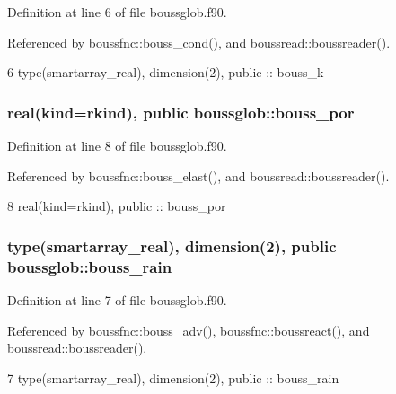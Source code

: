 Definition at line 6 of file boussglob.\+f90.



Referenced by boussfnc\+::bouss\+\_\+cond(), and boussread\+::boussreader().


\begin{DoxyCode}
6   \textcolor{keywordtype}{type}(smartarray_real), \textcolor{keywordtype}{dimension(2)}, \textcolor{keywordtype}{public} :: bouss_k
\end{DoxyCode}
\subsubsection[{bouss\+\_\+por}]{\setlength{\rightskip}{0pt plus 5cm}real(kind=rkind), public boussglob\+::bouss\+\_\+por}\label{namespaceboussglob_a22f276259c3f43d3bfde4ee94bb0046a}


Definition at line 8 of file boussglob.\+f90.



Referenced by boussfnc\+::bouss\+\_\+elast(), and boussread\+::boussreader().


\begin{DoxyCode}
8   \textcolor{keywordtype}{real(kind=rkind)}, \textcolor{keywordtype}{public} :: bouss_por
\end{DoxyCode}
\subsubsection[{bouss\+\_\+rain}]{\setlength{\rightskip}{0pt plus 5cm}type({\bf smartarray\+\_\+real}), dimension(2), public boussglob\+::bouss\+\_\+rain}\label{namespaceboussglob_abfa33c9e10e3d3209b4885cbaf2f91a4}


Definition at line 7 of file boussglob.\+f90.



Referenced by boussfnc\+::bouss\+\_\+adv(), boussfnc\+::boussreact(), and boussread\+::boussreader().


\begin{DoxyCode}
7   \textcolor{keywordtype}{type}(smartarray_real), \textcolor{keywordtype}{dimension(2)}, \textcolor{keywordtype}{public} :: bouss_rain
\end{DoxyCode}
